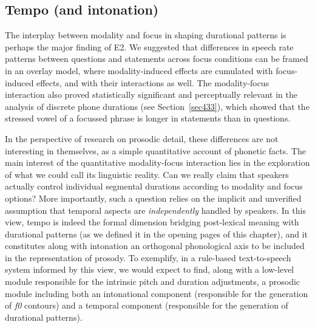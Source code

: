 \subsection{Tempo (and intonation)}\label{sec452}
The interplay between modality and focus in shaping durational patterns is perhaps the major finding of E2. We suggested that differences in speech rate patterns between questions and statements across focus conditions can be framed in an overlay model, where modality-induced effects are cumulated with focus-induced effects, and with their interactions as well. The modality-focus interaction also proved statistically significant and perceptually relevant in the analysis of discrete phone durations (see Section~\ref{sec433}), which showed that the stressed vowel of a focussed phrase is longer in statements than in questions. 

In the perspective of research on prosodic detail, these differences are not interesting in themselves, as a simple quantitative account of phonetic facts. The main interest of the quantitative modality-focus interaction lies in the exploration of what we could call its linguistic reality. Can we really claim that speakers actually control individual segmental durations according to modality and focus options? More importantly, such a question relies on the implicit and unverified assumption that temporal aspects are \textit{independently} handled by speakers. In this view, tempo is indeed the formal dimension bridging post-lexical meaning with durational patterns (as we defined it in the opening pages of this chapter), and it constitutes along with intonation an orthogonal phonological axis to be included in the representation of prosody. To exemplify, in a rule-based text-to-speech system informed by this view, we would expect to find, along with a low-level module responsible for the intrinsic pitch and duration adjustments, a prosodic module including both an intonational component (responsible for the generation of \textit{f0} contours) and a temporal component (responsible for the generation of durational patterns).

